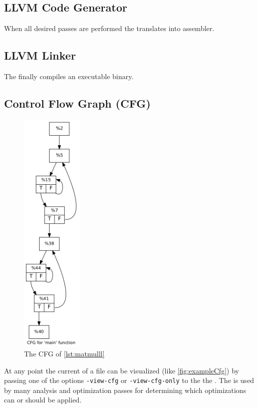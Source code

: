\subsection{LLVM Code Generator}
When all desired passes are performed the \generator translates \llvmir into assembler.
\subsection{LLVM Linker}
The \linker finally compiles an executable binary.
\subsection{Control Flow Graph (CFG)}
\begin{figure}
    \caption{The CFG of \autoref{lst:matmulll}}
    \label{fig:exampleCfg}
    \includegraphics[height=12cm]{gfx/matmulCfg.png}
\end{figure}
At any point the current \cfg of a \llvmir file can be visualized (like \autoref{fig:exampleCfg}) by passing one of the options \texttt{-view-cfg} or \texttt{-view-cfg-only} to the the \opt.
The \cfg is used by many analysis and optimization passes for determining which optimizations can or should be applied.
